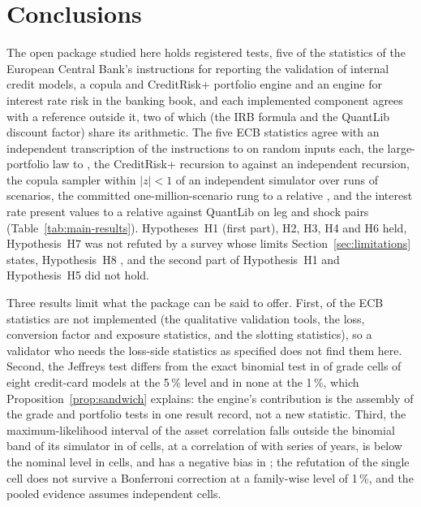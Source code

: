 \section{Conclusions}
\label{sec:conclusions}

The open package studied here holds \testsTotal{} registered tests, five of the \ecbSections{} statistics of the European Central Bank's instructions for reporting the validation of internal credit models, a copula and CreditRisk+ portfolio engine and an engine for interest rate risk in the banking book, and each implemented component agrees with a reference outside it, two of which (the IRB formula and the QuantLib discount factor) share its arithmetic.
The five ECB statistics agree with an independent transcription of the instructions to \ecbAllMax{} on \ecbInputs{} random inputs each, the large-portfolio law to \lhpMax{}, the CreditRisk+ recursion to \crpIndMax{} against an independent recursion, the copula sampler within $|z|<1$ of an independent simulator over \mcReps{} runs of \mcScen{} scenarios, the committed one-million-scenario rung to a relative \regenRel{}, and the interest rate present values to a relative \irrQlMax{} against QuantLib on \irrLegs{} leg and shock pairs (Table~\ref{tab:main-results}).
Hypotheses~H1 (first part), H2, H3, H4 and H6 held, Hypothesis~H7 was not refuted by a survey whose limits Section~\ref{sec:limitations} states, Hypothesis~H8 \ablHEight{}, and the second part of Hypothesis~H1 and Hypothesis~H5 did not hold.

Three results limit what the package can be said to offer.
First, \ecbAbsent{} of the \ecbSections{} ECB statistics are not implemented (the qualitative validation tools, the loss, conversion factor and exposure statistics, and the slotting statistics), so a validator who needs the loss-side statistics as specified does not find them here.
Second, the Jeffreys test differs from the exact binomial test in \disagreeFive{} of \cCells{} grade cells of eight credit-card models at the 5\,\% level and in none at the 1\,\%, which Proposition~\ref{prop:sandwich} explains: the engine's contribution is the assembly of the grade and portfolio tests in one result record, not a new statistic.
Third, the maximum-likelihood interval of the asset correlation falls outside the binomial band of its simulator in \gridMlFail{} of \gridMlCells{} cells, at a correlation of \gridMlWorstRho{} with series of \gridMlWorstYears{} years, is below the nominal level in \gridMlBelow{} cells, and has a negative bias in \gridMlNegBias{}; the refutation of the single cell does not survive a Bonferroni correction at a family-wise level of 1\,\%, and the pooled evidence assumes independent cells.

